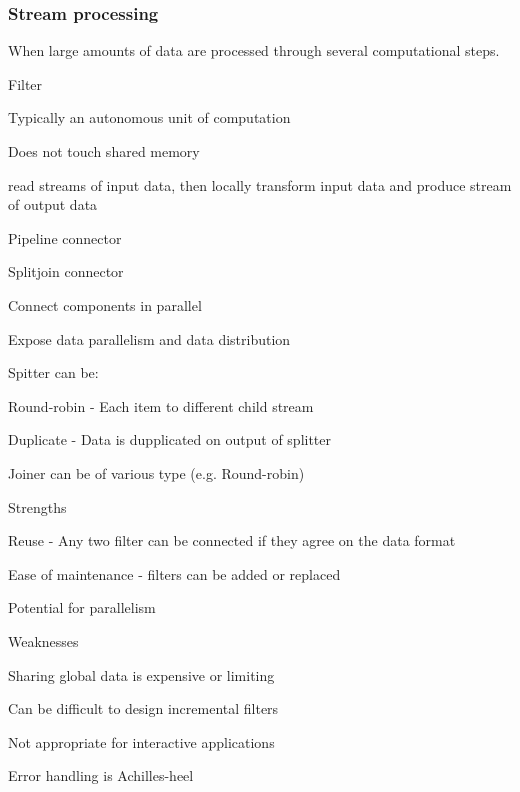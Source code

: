\subsubsection{Stream processing}
When large amounts of data are processed through several computational steps.
\enumstart
	\item Filter
	\enumstart
		\item Typically an autonomous unit of computation
		\item Does not touch shared memory
		\item read streams of input data, then locally transform input data and produce stream of output data
	\enumend
	\item Pipeline connector
	\item Splitjoin connector
	\enumstart
		\item Connect components in parallel
		\item Expose data parallelism and data distribution
		\item Spitter can be:
		\enumstart
			\item Round-robin - Each item to different child stream
			\item Duplicate - Data is dupplicated on output of splitter
		\enumend
		\item Joiner can be of various type (e.g. Round-robin)
	\enumend
	\item Strengths
	\enumstart
		\item Reuse - Any two filter can be connected if they agree on the data format
		\item Ease of maintenance - filters can be added or replaced
		\item Potential for parallelism
	\enumend
	\item Weaknesses
	\enumstart
		\item Sharing global data is expensive or limiting
		\item Can be difficult to design incremental filters
		\item Not appropriate for interactive applications
		\item Error handling is Achilles-heel
	\enumend
\enumend

